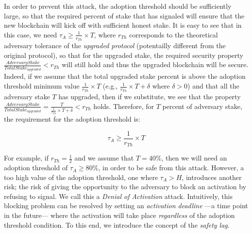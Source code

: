 {In order to prevent this attack, the adoption threshold should be sufficiently 
large, so that the required percent of stake that has signaled will ensure that 
the new blockchain will kick off with sufficient honest stake. It is easy to 
see that in this case, we need $\tau_A \geq \frac{1}{r_{Th}} \times T$, where 
$r_{Th}$ corresponds to the theoretical adversary tolerance of the 
\emph{upgraded protocol} (potentailly different from the original protocol),  
so that for the upgraded stake, the required security property
$\frac{AdversaryStake}{TotalStake_{upgraded}} < r_{Th}$ will still hold and thus the upgraded blockchain will be secure. Indeed, if we assume that the total upgraded stake percent is above the adoption threshold minimum value $\frac{1}{r_{Th}} \times T$ (e.g., $\frac{1}{r_{Th}} \times T + \delta$ where $\delta > 0$) and that all the adversary stake $T$ has upgraded, then if we substitute, we see that the property $\frac{AdversaryStake}{TotalStake_{upgraded}} = \frac{T}{\frac{1}{r_{Th}} \times T + \delta} < r_{Th}$ holds. Therefore, for $T$ percent of adversary stake, the requirement for the adoption threshold is:

\begin{equation} \label{tauA}
\tau_A \geq \frac{1}{r_{Th}} \times T
\end{equation}

For example, if $r_{Th} = \frac{1}{2}$ and we assume that $T = 40\%$, then we will need an adoption threshold of $\tau_A \geq 80\% $, in order to be safe from this attack. However, a too high value of the adoption threshold, one where $\tau_A > H$, introduces another risk; the risk of  giving the opportunity to the adversary to block an activation by refusing to signal. We call this a \emph{Denial of Activation} attack. Intuitively, this blocking problem can be resolved by setting an \emph{activation deadline} ---a time point in the future--- where the activation will take place \emph{regardless} of the adoption threshold condition. To this end, we introduce the concept of the \emph{safety lag}.

}

